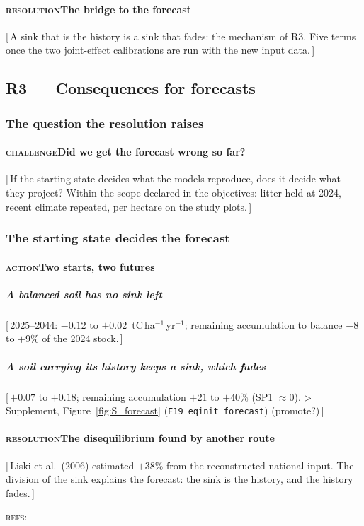 \documentclass[11pt]{article}
\newcounter{subsubparagraph}[subparagraph]
\newcommand{\beat}[1]{\textcolor{black!45}{\textsc{\small #1}}\enspace}
\newcommand{\gap}[1]{\textcolor{red!70!black}{\small[\,#1\,]}}
\newcommand{\refs}[1]{\par\textcolor{red!70!black}{\footnotesize\textsc{refs:}\ #1}\par}
\newcommand{\suppanchor}[2]{\textcolor{red!70!black}{\small$\triangleright$\,Supplement,
  Figure~\ref{fig:#1} (\texttt{#2})}}
\begin{document}
\paragraph{\beat{resolution}The bridge to the forecast}
\gap{A sink that is the history is a sink that fades: the mechanism of R3. Five terms once the two
joint-effect calibrations are run with the new input data.}

\subsection{R3 --- Consequences for forecasts}\label{sec:r3}

\subsubsection{The question the resolution raises}
\paragraph{\beat{challenge}Did we get the forecast wrong so far?}
\gap{If the starting state decides what the models reproduce, does it decide what they project?
Within the scope declared in the objectives: litter held at 2024, recent climate repeated, per
hectare on the study plots.}

\subsubsection{The starting state decides the forecast}
\paragraph{\beat{action}Two starts, two futures}
\subparagraph{A balanced soil has no sink left}
\gap{2025--2044: $-0.12$ to $+0.02$~tC\,ha$^{-1}$\,yr$^{-1}$; remaining accumulation to balance
$-8$ to $+9\%$ of the 2024 stock.}
\subparagraph{A soil carrying its history keeps a sink, which fades}
\gap{$+0.07$ to $+0.18$; remaining accumulation $+21$ to $+40\%$ (SP1 $\approx0$).
\suppanchor{S_forecast}{F19\_eqinit\_forecast} (promote?)}
\paragraph{\beat{resolution}The disequilibrium found by another route}
\gap{Liski et al.\ (2006) estimated $+38\%$ from the reconstructed national input. The division of
the sink explains the forecast: the sink is the history, and the history fades.}
\refs{\citet{Liski2006}}
\end{document}
